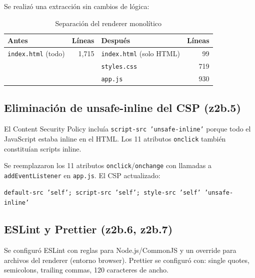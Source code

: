 \documentclass[12pt,a4paper]{article}
\begin{document}
\begin{fixbox}
Se realiz\'o una extracci\'on sin cambios de l\'ogica:
\end{fixbox}

\begin{table}[H]
\centering
\renewcommand{\arraystretch}{1.3}
\begin{tabular}{l r l r}
\toprule
\textbf{Antes} & \textbf{L\'ineas} & \textbf{Despu\'es} & \textbf{L\'ineas} \\
\midrule
\texttt{index.html} (todo) & 1,715 & \texttt{index.html} (solo HTML) & 99 \\
 & & \texttt{styles.css} & 719 \\
 & & \texttt{app.js} & 930 \\
\bottomrule
\end{tabular}
\caption{Separaci\'on del renderer monol\'itico}
\end{table}

\subsection{Eliminaci\'on de unsafe-inline del CSP (z2b.5)}

\begin{findingbox}
El Content Security Policy inclu\'ia \texttt{script-src 'unsafe-inline'} porque todo el JavaScript estaba inline en el HTML. Los 11 atributos \texttt{onclick} tambi\'en constitu\'ian scripts inline.
\end{findingbox}

\begin{fixbox}
Se reemplazaron los 11 atributos \texttt{onclick}/\texttt{onchange} con llamadas a \texttt{addEventListener} en \texttt{app.js}. El CSP actualizado:

\texttt{default-src 'self'; script-src 'self'; style-src 'self' 'unsafe-inline'}
\end{fixbox}

\subsection{ESLint y Prettier (z2b.6, z2b.7)}

Se configur\'o ESLint con reglas para Node.js/CommonJS y un override para archivos del renderer (entorno browser). Prettier se configur\'o con: single quotes, semicolons, trailing commas, 120 caracteres de ancho.
\end{document}
